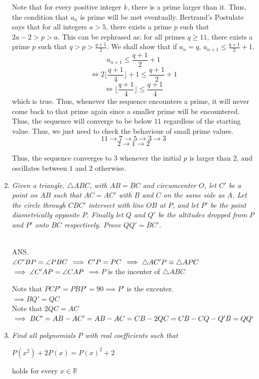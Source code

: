 \documentclass{article}
\begin{document}
\begin{enumerate}
Note that for every positive integer $k$, there is a prime larger than it. Thus, the condition that $a_n$ is prime will be met eventually. Bertrand's Postulate says that for all integers $a > 5$, there exists a prime $p$ such that $2a - 2 > p > a$. This can be rephrased as: for all primes $q \ge 11$, there exists a prime $p$ such that $q > p > \frac{q + 1}{2}$. We shall show that if $a_n = q$, $a_{n + 1} \le \frac{q + 1}{2} + 1$.
$$a_{n + 1} \le \frac{q + 1}{2} + 1$$
$$\iff 2\lfloor \frac{q + 1}{4}\rfloor + 1 \le \frac{q + 1}{2} + 1$$
$$\iff \lfloor \frac{q + 1}{4} \rfloor \le \frac{q + 1}{4}$$
which is true. Thus, whenever the sequence encounters a prime, it will never come back to that prime again since a smaller prime will be encountered. Thus, the sequence will converge to be below $11$ regardless of the starting value. Thus, we just need to check the behaviour of small prime values.
$$11 \rightarrow 7 \rightarrow 5 \rightarrow 3 \rightarrow 3$$
$$2 \rightarrow 1 \rightarrow 2$$

Thus, the sequence converges to $3$ whenever the initial $p$ is larger than $2$, and oscillates between $1$ and $2$ otherwise.

\medskip
\item %
{\itshape Given a triangle, $\triangle ABC$, with $AB = BC$ and circumcenter $O$, let $C'$ be a point on $AB$ such that $AC = AC'$ with $B$ and $C$ on the same side as $A$. Let the circle through $CBC'$ intersect with line $OB$ at $P$, and let $P'$ be the point diametrically opposite $P$. Finally let $Q$ and $Q'$ be the altitudes dropped from $P$ and $P'$ onto $BC$ respectively. Prove $QQ' = BC'$.
}

\\ANS.\\
$\angle C'BP = \angle PBC\\$
$\implies C'P = PC\\$
$\implies \triangle AC'P \equiv \triangle APC\\$
$\implies \angle C'AP = \angle CAP\\$
$\implies P$ is the incenter of $\triangle ABC$ 

Note that $PCP' = PBP' = 90 \implies P'$ is the excenter.\\
$\implies BQ' = QC$\\
Note that $2QC = AC$\\
$\implies BC' = AB - AC' = AB - AC = CB - 2QC = CB - CQ - Q'B = QQ`$

\medskip
\item %
{\itshape Find all polynomials $P$ with real coefficients such that
\begin{center}
    $P(x^2) + 2P(x) = {P(x)}^2 + 2$
\end{center}
holds for every $x\in\mathbb{R}$
}


\end{enumerate}
\end{document}
